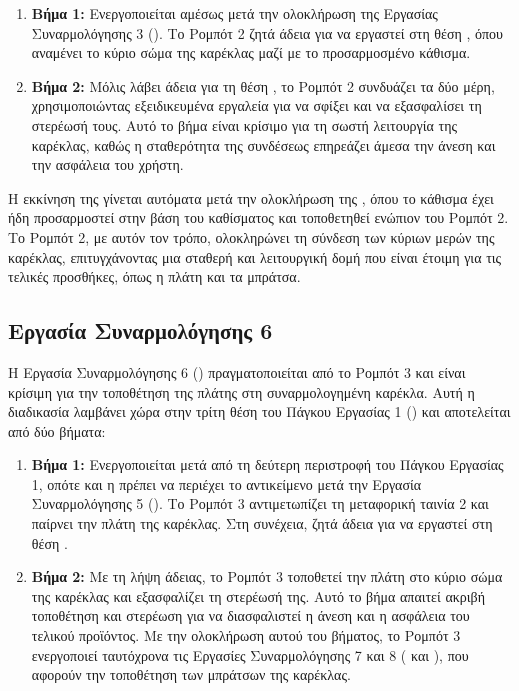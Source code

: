 \begin{enumerate}
  \item \textbf{Βήμα 1:} Ενεργοποιείται αμέσως μετά την ολοκλήρωση της Εργασίας Συναρμολόγησης 3 (). Το Ρομπότ 2 ζητά άδεια για να εργαστεί στη θέση , όπου αναμένει το κύριο σώμα της καρέκλας μαζί με το προσαρμοσμένο κάθισμα.
  \item \textbf{Βήμα 2:} Μόλις λάβει άδεια για τη θέση , το Ρομπότ 2 συνδυάζει τα δύο μέρη, χρησιμοποιώντας εξειδικευμένα εργαλεία για να σφίξει και να εξασφαλίσει τη στερέωσή τους. Αυτό το βήμα είναι κρίσιμο για τη σωστή λειτουργία της καρέκλας, καθώς η σταθερότητα της συνδέσεως επηρεάζει άμεσα την άνεση και την ασφάλεια του χρήστη.
\end{enumerate}

Η εκκίνηση της  γίνεται αυτόματα μετά την ολοκλήρωση της , όπου το κάθισμα έχει ήδη προσαρμοστεί στην βάση του καθίσματος και τοποθετηθεί ενώπιον του Ρομπότ 2. Το Ρομπότ 2, με αυτόν τον τρόπο, ολοκληρώνει τη σύνδεση των κύριων μερών της καρέκλας, επιτυγχάνοντας μια σταθερή και λειτουργική δομή που είναι έτοιμη για τις τελικές προσθήκες, όπως η πλάτη και τα μπράτσα.

\subsection{Εργασία Συναρμολόγησης 6}
Η Εργασία Συναρμολόγησης 6 () πραγματοποιείται από το Ρομπότ 3 και είναι κρίσιμη για την τοποθέτηση της πλάτης στη συναρμολογημένη καρέκλα. Αυτή η διαδικασία λαμβάνει χώρα στην τρίτη θέση του Πάγκου Εργασίας 1 () και αποτελείται από δύο βήματα:

\begin{enumerate}
  \item \textbf{Βήμα 1:} Ενεργοποιείται μετά από τη δεύτερη περιστροφή του Πάγκου Εργασίας 1, οπότε και η  πρέπει να περιέχει το αντικείμενο μετά την Εργασία Συναρμολόγησης 5 (). Το Ρομπότ 3 αντιμετωπίζει τη μεταφορική ταινία 2 και παίρνει την πλάτη της καρέκλας. Στη συνέχεια, ζητά άδεια για να εργαστεί στη θέση .
  \item \textbf{Βήμα 2:} Με τη λήψη άδειας, το Ρομπότ 3 τοποθετεί την πλάτη στο κύριο σώμα της καρέκλας και εξασφαλίζει τη στερέωσή της. Αυτό το βήμα απαιτεί ακριβή τοποθέτηση και στερέωση για να διασφαλιστεί η άνεση και η ασφάλεια του τελικού προϊόντος. Με την ολοκλήρωση αυτού του βήματος, το Ρομπότ 3 ενεργοποιεί ταυτόχρονα τις Εργασίες Συναρμολόγησης 7 και 8 ( και ), που αφορούν την τοποθέτηση των μπράτσων της καρέκλας.
\end{enumerate}

